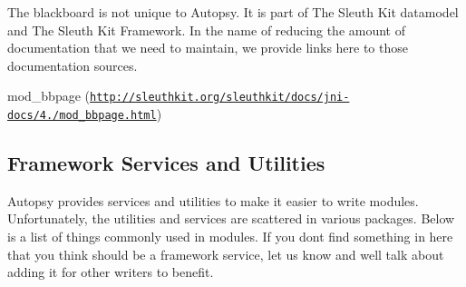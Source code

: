 The blackboard is not unique to Autopsy. It is part of The Sleuth Kit datamodel and The Sleuth Kit Framework. In the name of reducing the amount of documentation that we need to maintain, we provide links here to those documentation sources.


\begin{DoxyItemize}
\item mod\+\_\+bbpage (\href{http://sleuthkit.org/sleuthkit/docs/jni-docs/4.3/mod_bbpage.html}{\tt http\+://sleuthkit.\+org/sleuthkit/docs/jni-\/docs/4./mod\+\_\+bbpage.\+html})
\end{DoxyItemize}\hypertarget{platform_page_mod_dev_other_services}{}\subsection{Framework Services and Utilities}\label{platform_page_mod_dev_other_services}
Autopsy provides services and utilities to make it easier to write modules. Unfortunately, the utilities and services are scattered in various packages. Below is a list of things commonly used in modules. If you don\textquotesingle{}t find something in here that you think should be a framework service, let us know and we\textquotesingle{}ll talk about adding it for other writers to benefit.


